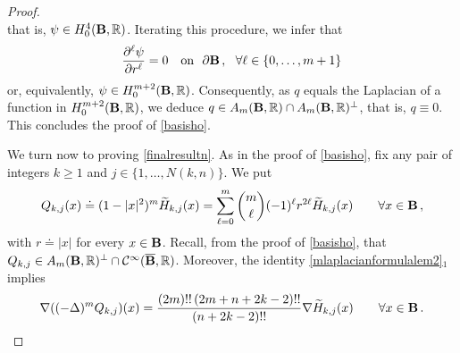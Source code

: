 \documentclass[11pt]{article}
\theoremstyle{plain}
\theoremstyle{definition}
\numberwithin{equation}{section}
\newcommand{\B}{{\bf B}}
\begin{document}
\begin{proof}
$$$$
that is, $\psi \in H_{0}^{4}(\B, \mathbb{R})$. Iterating this procedure, we infer that
$$
\dfrac{\partial^{\ell} \psi}{\partial r^{\ell}} = 0 \quad \text{on} \ \ \partial \B \, , \ \ \forall \ell \in \{0,\ldots,m+1\}
$$
or, equivalently, $\psi \in H_{0}^{m+2}(\B, \mathbb{R})$. Consequently, as $q$ equals the Laplacian of a function in $H_{0}^{m+2}(\B, \mathbb{R})$, we deduce $q \in A_{m}(\B, \mathbb{R}) \cap A_{m}(\B, \mathbb{R})^{\perp}$, that is, $q \equiv 0$. This concludes the proof of \eqref{basisho}.\par

\bigskip
We turn now to proving \eqref{finalresultn}.
As in the proof of \eqref{basisho}, fix any pair of integers $k \geq 1$ and $j \in \{1,\ldots,N(k,n)\}$. We put
$$
Q_{k,j}(x) \doteq (1 - |x|^{2})^{m} \widetilde{H}_{k,j}(x) = \sum_{\ell=0}^{m} {m \choose \ell} (-1)^{\ell} r^{2\ell} \widetilde{H}_{k,j}(x) \qquad \forall x \in \B \, ,
$$
with $r \doteq |x|$ for every $x \in \B$. Recall, from the proof of \eqref{basisho}, that $Q_{k,j} \in A_{m}(\B, \mathbb{R})^{\perp} \cap \mathcal{C}^{\infty}(\overline{\B}, \mathbb{R})$. Moreover, the identity \eqref{mlaplacianformulalem2}$_1$ implies
\begin{equation} \label{gradlap1}
\nabla ((- \Delta)^{m} Q_{k,j})(x) = \dfrac{(2m)!! \, (2m+n+2k-2)!!}{(n+2k-2)!!} \nabla \widetilde{H}_{k,j}(x) \qquad \forall x \in \B \, .
\end{equation}


\end{proof}
\end{document}

